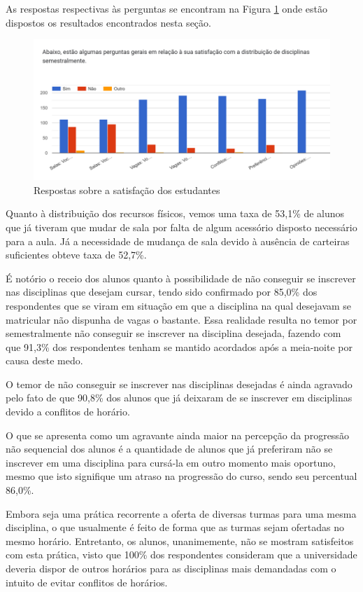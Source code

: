 As respostas respectivas às perguntas se encontram na Figura \ref{fig:3.0_Satisfacao} onde estão dispostos os resultados encontrados nesta seção.

\begin{figure}[htbp]\centering
  \caption{\label{fig:3.0_Satisfacao}Respostas sobre a satisfação dos estudantes}
  \includegraphics[scale=0.8]{files/img/Forms/3.0-Satisfacao.png}
\end{figure} %

Quanto à distribuição dos recursos físicos, vemos uma taxa de 53,1\% de alunos que já tiveram que mudar de sala por falta de algum acessório disposto necessário para a aula. Já a necessidade de mudança de sala devido à ausência de carteiras suficientes obteve taxa de 52,7\%.

É notório o receio dos alunos quanto à possibilidade de não conseguir se inscrever nas disciplinas que desejam cursar, tendo sido confirmado por 85,0\% dos respondentes que se viram em situação em que a disciplina na qual desejavam se matricular não dispunha de vagas o bastante. Essa realidade resulta no temor por semestralmente não conseguir se inscrever na disciplina desejada, fazendo com que 91,3\% dos respondentes tenham se mantido acordados após a meia-noite por causa deste medo.

O temor de não conseguir se inscrever nas disciplinas desejadas é ainda agravado pelo fato de que 90,8\% dos alunos que já deixaram de se inscrever em disciplinas devido a conflitos de horário.

O que se apresenta como um agravante ainda maior na percepção da progressão não sequencial dos alunos é a quantidade de alunos que já preferiram não se inscrever em uma disciplina para cursá-la em outro momento mais oportuno, mesmo que isto signifique um atraso na progressão do curso, sendo seu percentual 86,0\%.

Embora seja uma prática recorrente a oferta de diversas turmas para uma mesma disciplina, o que usualmente é feito de forma que as turmas sejam ofertadas no mesmo horário. Entretanto, os alunos, unanimemente, não se mostram satisfeitos com esta prática, visto que 100\% dos respondentes consideram que a universidade deveria dispor de outros horários para as disciplinas mais demandadas com o intuito de evitar conflitos de horários.

